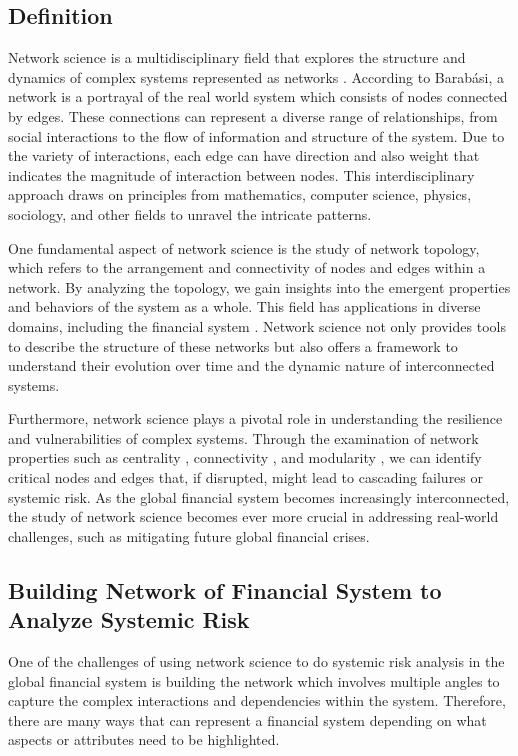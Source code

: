 \documentclass[a4paper,11pt]{article}
\begin{document}
\subsection{Definition}
Network science is a multidisciplinary field that explores the structure and dynamics of complex systems represented as networks \citep{Barabasi_2013}. According to Barabási, a network is a portrayal of the real world system which consists of nodes connected by edges. These connections can represent a diverse range of relationships, from social interactions to the flow of information and structure of the system. Due to the variety of interactions, each edge can have direction and also weight that indicates the magnitude of interaction between nodes. This interdisciplinary approach draws on principles from mathematics, computer science, physics, sociology, and other fields to unravel the intricate patterns.

One fundamental aspect of network science is the study of network topology, which refers to the arrangement and connectivity of nodes and edges within a network. By analyzing the topology, we gain insights into the emergent properties and behaviors of the system as a whole. This field has applications in diverse domains, including the financial system \citep{Patro_Qi_Sun_2013}. Network science not only provides tools to describe the structure of these networks but also offers a framework to understand their evolution over time and the dynamic nature of interconnected systems.

Furthermore, network science plays a pivotal role in understanding the resilience and vulnerabilities of complex systems. Through the examination of network properties such as centrality \citep{Roukny_Battiston_Stiglitz_2016}, connectivity \citep{So_Chan_Chu_2021}, and modularity \citep{Rovira_Kaltwasser_Spelta_2018}, we can identify critical nodes and edges that, if disrupted, might lead to cascading failures or systemic risk. As the global financial system becomes increasingly interconnected, the study of network science becomes ever more crucial in addressing real-world challenges, such as mitigating future global financial crises.

\subsection{Building Network of Financial System to Analyze Systemic Risk}
One of the challenges of using network science to do systemic risk analysis in the global financial system is building the network which involves multiple angles to capture the complex interactions and dependencies within the system. Therefore, there are many ways that can represent a financial system depending on what aspects or attributes need to be highlighted.
\end{document}
